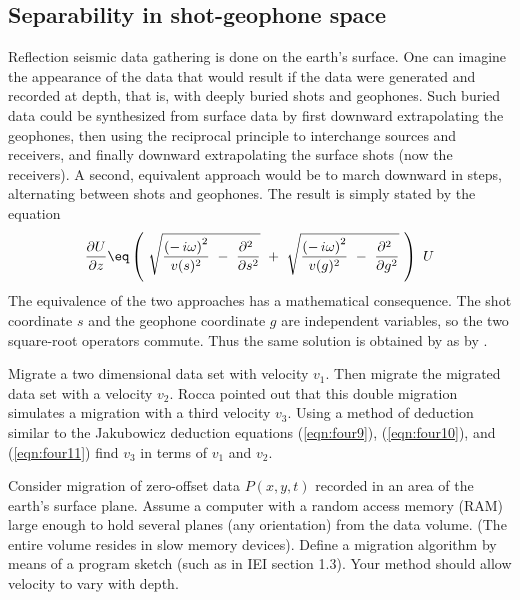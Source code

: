 {\subsection{Separability in shot-geophone space}
\par
Reflection seismic data gathering is done on
the earth's surface.
One can imagine the appearance of the data
that would result if the data were generated
and recorded at depth, that is, with
deeply buried shots and geophones.
Such
buried data could be synthesized from
surface data by first downward
extrapolating the geophones, then using the
reciprocal principle to interchange
sources and receivers, and finally downward
extrapolating the surface shots (now the receivers). 
A second, equivalent approach would
be to march downward in steps, alternating
between shots and geophones.
The result is simply stated by the equation
\begin{equation}
{\partial U  \over \partial z} \eq
\left( \  
        \sqrt{
                {{(-\,i \omega ) }^2  \over v ( s )^2}\ -\ 
                {\partial^2 \    \over \partial s^2} 
                }
\ +\ 
        \sqrt{
                {{(-\,i \omega )}^2  \over v ( g )^2}\ -\ 
                {\partial^2 \    \over \partial g^2}
                } \ 
\right) \  U
\label{eqn:four12}
\end{equation}
The equivalence of the two approaches
has a mathematical consequence.
The shot coordinate  $s$  and the geophone
coordinate  $g$  are independent variables,
so the two square-root operators commute.  
Thus the same solution is obtained by  as by .
\begin{exer}
\item
Migrate a two dimensional data set with velocity  $v_1$.
Then migrate the migrated data set with a velocity  $v_2$.
Rocca pointed out that this double migration
simulates a migration with a third velocity  $v_3$.
Using a method of deduction similar to the Jakubowicz deduction
equations (\ref{eqn:four9}), (\ref{eqn:four10}), and (\ref{eqn:four11})
find  $v_3$  in terms of  $v_1$  and  $v_2$.
\item
Consider migration of zero-offset data  $P(x,y,t)$  recorded
in an area of the earth's surface plane.
Assume a computer with a random access memory (RAM)
large enough to hold several planes (any orientation) from the data volume.
(The entire volume resides in slow memory devices).
Define a migration algorithm by means of a program sketch
(such as in IEI section 1.3).
Your method should allow velocity to vary with depth.
\end{exer}
}
